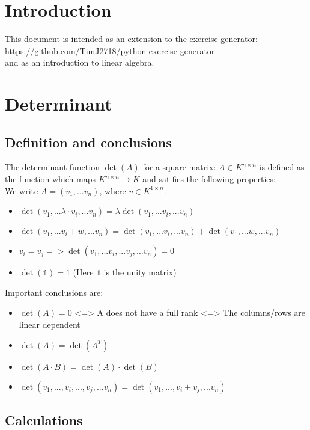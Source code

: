 \documentclass[10pt,a4paper]{article}
\begin{document}
\tableofcontents
\section{Introduction}
This document is intended as an extension to the exercise generator:\\
 \url{https://github.com/TimJ2718/python-exercise-generator}\\
and as an introduction to linear algebra. 
 
\section{Determinant}
\subsection{Definition and conclusions}
The determinant function $\det(A)$ for a square matrix: $A \in K^{n \times n}$ is defined as the function which maps $K^{n \times n} \rightarrow K$ and satifies the following properties:\\
We write $A=(v_1,...v_n)$, where $v \in K ^{1 \times n}$.
\begin{itemize}
	\item $\det(v_1,...\lambda \cdot v_i,...v_n) = \lambda \det(v_1, ... v_i, ... v_n)$
	\item $\det(v_1,...v_i+w,...v_n) = \det(v_1, ...v_i,...v_n) + \det(v_1,...w,...v_n)$
	\item $v_i = v_j => \det(v_1,...v_i,...v_j,...v_n)=0$ 
	\item $\det(\mathbb{1})=1$ (Here $\mathbb{1}$ is the unity matrix)
\end{itemize}
Important conclusions are:
\begin{itemize}
	\item $\det(A)=0 $ <=> A does not have a full rank <=> The columns/rows are linear dependent
	\item $\det(A)=\det(A^T)$
	\item $\det(A \cdot B) = \det(A) \cdot \det(B)$
	\item $\det(v_1, ..., v_i, ..., v_j , ...v_n) = \det(v_1, ..., v_i+v_j, ...v_n)$
\end{itemize}
\subsection{Calculations}
\end{document}
